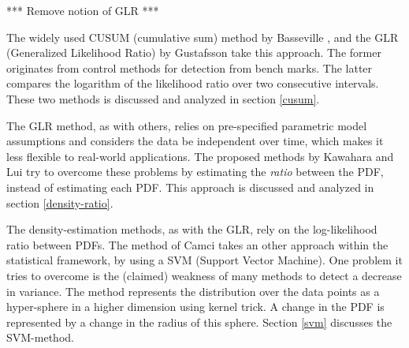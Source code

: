 *** Remove notion of GLR ***


The widely used CUSUM (cumulative sum) method by Basseville \etal \cite{basseville1993detection}, and the GLR (Generalized Likelihood Ratio) by Gustafsson \cite{gustafsson1996marginalized,gustafsson2000adaptive} take this approach.
The former originates from control methods for detection from bench marks.
The latter compares the logarithm of the likelihood ratio over two consecutive intervals.
These two methods is discussed and analyzed in section \ref{cusum}.

The GLR method, as with others, relies on pre-specified parametric model assumptions and considers the data be independent over time, which makes it less flexible to real-world applications.
The proposed methods by Kawahara \etal \cite{kawahara2009change} and Lui \etal \cite{liu2013change} try to overcome these problems by estimating the \emph{ratio} between the PDF, instead of estimating each PDF.
This approach is discussed and analyzed in section \ref{density-ratio}.

The density-estimation methods, as with the GLR, rely on the log-likelihood ratio between PDFs.
The method of Camci \cite{camci2010change} takes an other approach within the statistical framework, by using a SVM (Support Vector Machine).
One problem it tries to overcome is the (claimed) weakness of many methods to detect a decrease in variance.
The method represents the distribution over the data points as a hyper-sphere in a higher dimension using kernel trick.
A change in the PDF is represented by a change in the radius of this sphere.
Section \ref{svm} discusses the SVM-method.










% 
